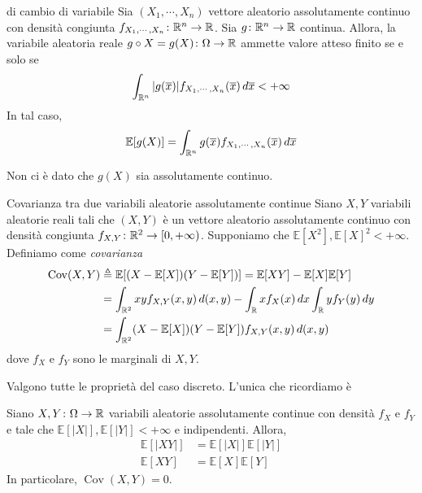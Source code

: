 \documentclass[a4paper]{article}
\begin{document}
\begin{snippettheorem}{di cambio di variabile}
    Sia \((X_1, \cdots, X_n)\) vettore aleatorio assolutamente continuo
    con densità congiunta \(f_{X_1, \cdots, X_n} \colon \mathbb{R}^n \to \mathbb{R}\).
    Sia \(g \colon \mathbb{R}^n \to \mathbb{R}\) continua.
    Allora, la variabile aleatoria reale \(g \circ X = g(X) \colon \Omega \to \mathbb{R}\)
    ammette valore atteso finito se e solo se
    \[
        \int_{\mathbb{R}^n} |g(\overline x)| f_{X_1, \cdots, X_n}(\overline x)\,d\overline x < +\infty
    \]
    In tal caso,
    \[
        \mathbb E[g(X)] = \int_{\mathbb{R}^n} g(\overline x)f_{X_1, \cdots, X_n}(\overline x)\,d\overline x
    \]
\end{snippettheorem}

Non ci è dato che \(g(X)\) sia assolutamente continuo.

\begin{snippetdefinition}{Covarianza tra due variabili aleatorie assolutamente continue}
    Siano \(X,Y\) variabili aleatorie reali tali che
    \((X,Y)\) è un vettore aleatorio assolutamente continuo con densità
    congiunta \(f_{X,Y} \colon \mathbb{R}^2 \to [0,+\infty)\).
    Supponiamo che \(\mathbb E[X^2], \mathbb E[X]^2 < +\infty\). Definiamo come \emph{covarianza}
    \begin{align*}
        \operatorname{Cov}(X,Y) &\triangleq \mathbb E[(X- \mathbb E[X])(Y- \mathbb E[Y])]
        = \mathbb E[XY] - \mathbb E[X]\mathbb E[Y] \\
        &= \int_{\mathbb{R}^2} xyf_{X,Y}(x,y)\,d(x,y) - \int_{\mathbb{R}} xf_X(x)\,dx
        \int_{\mathbb{R}} yf_Y(y)\,dy \\
        &= \int_{\mathbb{R}^2}(X- \mathbb E[X])(Y - \mathbb E[Y]) f_{X,Y}(x,y)\,d(x,y)
    \end{align*}
    dove \(f_X\) e \(f_Y\) sono le marginali di \(X,Y\).
\end{snippetdefinition}

Valgono tutte le proprietà del caso discreto.
L'unica che ricordiamo è

\begin{snippetproposition}{}
    Siano \(X,Y \colon \Omega \to \mathbb{R}\) variabili aleatorie assolutamente continue
    con densità
    \(f_X\) e \(f_Y\) e tale che \(\mathbb E[|X|], \mathbb E[|Y|] < +\infty\) e indipendenti.
    Allora,
    \begin{align*}
        \mathbb E[|XY|] &= \mathbb E[|X|]\mathbb E[|Y|] \\
        \mathbb E[XY] &= \mathbb E[X] \mathbb E[Y]
    \end{align*}
    In particolare, \(\operatorname{Cov}(X,Y) = 0\).
\end{snippetproposition}
\end{document}
